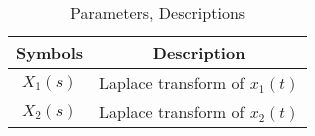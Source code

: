 \begin{table}[ht!]
\centering
\begin{tabular}{ |c|c| } 
 \hline
Symbols & Description \\
\hline
 $X_1(s)$ & Laplace transform of $x_1(t)$ \\
 \hline
 $X_2(s)$ & Laplace transform of $x_2(t)$\\
\hline
\end{tabular}
\caption{Parameters, Descriptions}
\label{table:ee25-tab2}
\end{table}




